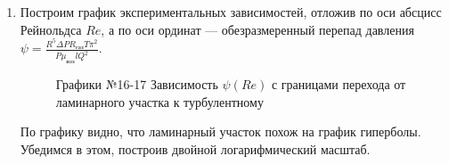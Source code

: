 \documentclass[a4paper]{article}
\begin{document}
\begin{enumerate}
\item Построим график экспериментальных зависимостей, отложив по оси абсцисс Рейнольдса $Re$, а по оси ординат — обезразмеренный перепад давления $\psi = \frac{R^5\Delta P R_{\text{газ}}T\pi^2}{P\mu_{\text{воз}}lQ^2}$.
\clearpage
\begin{figure}[h!]
\caption[]{\label{} Графики №16-17 Зависимость $\psi(Re)$ с границами перехода от ламинарного участка к турбулентному}
\end{figure}
По графику видно, что ламинарный участок похож на график гиперболы. Убедимся в этом, построив двойной логарифмический масштаб.
\begin{figure}[h!]

\end{figure}
\end{enumerate}
\end{document}
